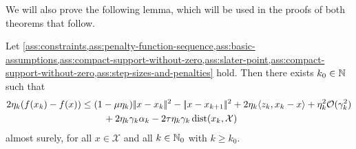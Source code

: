 We will also prove the following lemma, which will be used in the proofs of both
theorems that follow.
\begin{lemma}
    \label{lem:pre-main-theorems-shared-inequality}
    Let \cref{ass:constraints,ass:penalty-function-sequence,ass:basic-assumptions,ass:compact-support-without-zero,ass:slater-point,ass:compact-support-without-zero,ass:step-sizes-and-penalties}
    hold. Then there exists $k_0\in\mathbb{N}$ such that
    \begin{align*}
        2\eta_k (f(x_{k}) - f(x))
        &\leq
        (1-\mu\eta_k)|\!|x - x_k|\!|^2 - |\!|x - x_{k+1}|\!|^2 + 2\eta_k\langle z_k, x_k - x \rangle
            + \eta_k^2 \mathcal{O}(\gamma_k^2) \\
            &\phantom{===} + 2\eta_k\gamma_k\alpha_k - 2\tau \eta_k \gamma_k \operatorname{dist}(x_k, \mathcal{X})
    \end{align*}
    almost surely, for all $x\in\mathcal{X}$ and all $k\in\mathbb{N}_0$ with $k \geq k_0$.
\end{lemma}
